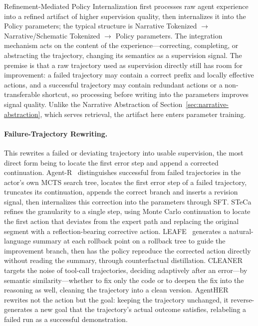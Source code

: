 Refinement-Mediated Policy Internalization first processes raw agent experience into a refined artifact of higher supervision quality, then internalizes it into the Policy parameters; the typical structure is Narrative Tokenized $\rightarrow$ Narrative/Schematic Tokenized $\rightarrow$ Policy parameters. The integration mechanism acts on the content of the experience---correcting, completing, or abstracting the trajectory, changing its semantics as a supervision signal. The premise is that a raw trajectory used as supervision directly still has room for improvement: a failed trajectory may contain a correct prefix and locally effective actions, and a successful trajectory may contain redundant actions or a non-transferable shortcut, so processing before writing into the parameters improves signal quality. Unlike the Narrative Abstraction of Section~\ref{sec:narrative-abstraction}, which serves retrieval, the artifact here enters parameter training.

\paragraph{Failure-Trajectory Rewriting.} This rewrites a failed or deviating trajectory into usable supervision, the most direct form being to locate the first error step and append a corrected continuation. Agent-R~\cite{Yua25c} distinguishes successful from failed trajectories in the actor's own MCTS search tree, locates the first error step of a failed trajectory, truncates its continuation, appends the correct branch and inserts a revision signal, then internalizes this correction into the parameters through SFT. STeCa~\cite{Wan25x} refines the granularity to a single step, using Monte Carlo continuation to locate the first action that deviates from the expert path and replacing the original segment with a reflection-bearing corrective action. LEAFE~\cite{Ge26} generates a natural-language summary at each rollback point on a rollback tree to guide the improvement branch, then has the policy reproduce the corrected action directly without reading the summary, through counterfactual distillation. CLEANER~\cite{Xu26j} targets the noise of tool-call trajectories, deciding adaptively after an error---by semantic similarity---whether to fix only the code or to deepen the fix into the reasoning as well, cleaning the trajectory into a clean version. AgentHER~\cite{Din26} rewrites not the action but the goal: keeping the trajectory unchanged, it reverse-generates a new goal that the trajectory's actual outcome satisfies, relabeling a failed run as a successful demonstration.

